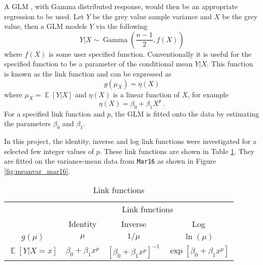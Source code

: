 \documentclass[12pt, a4paper]{memoir}
\DeclareMathOperator{\expectation}{\mathbb{E}}
\DeclareMathOperator{\gammaDist}{Gamma}
\begin{document}
A GLM \citep{nelder1972generalized} \citep{nelder1972generalized_2} \citep{mccullagh1984generalized}, with Gamma distributed response, would then be an appropriate regression to be used. Let $Y$ be the grey value sample variance and $X$ be the grey value, then a GLM models $Y$ via the following
\begin{equation}
    Y|X \sim 
    \gammaDist\left(
        \frac{n-1}{2},
        f(X)
    \right)
\end{equation}
where $f(X)$ is some user specified function. Conventionally it is useful for the specified function to be a parameter of the conditional mean $Y|X$. This function is known as the link function and can be expressed as
\begin{equation}
g(\mu_X) = \eta(X)
\end{equation}
where $\mu_X=\expectation\left[Y|X\right]$ and $\eta(X)$ is a linear function of $X$, for example
\begin{equation}
\eta(X) = \beta_0 + \beta_1 X^p \ .
\end{equation}
For a specified link function and $p$, the GLM is fitted onto the data by estimating the parameters $\beta_0$ and $\beta_1$.

In this project, the identity, inverse and log link functions were investigated for a selected few integer values of $p$. These link functions are shown in Table \ref{table:meanvar_linkfunctions}. They are fitted on the variance-mean data from \texttt{Mar16} as shown in Figure \ref{fig:meanvar_mar16}.

\begin{table}
    \centering
    \begin{tabular}{c|c|c|c}
    &\multicolumn{3}{c}{Link functions}\\
    &Identity&Inverse&Log\\
    \hline
    $g(\mu)$&$\mu$&$1/\mu$&$\ln(\mu)$\\
    \hline
    $\expectation[Y|X=x]$&$\beta_0 + \beta_1 x^p$&$\left[\beta_0 + \beta_1 x^p\right]^{-1}$&$\exp\left[\beta_0 + \beta_1 x^p\right]$
    \end{tabular}
    \caption{Link functions}
    \label{table:meanvar_linkfunctions}
\end{table}
\end{document}
